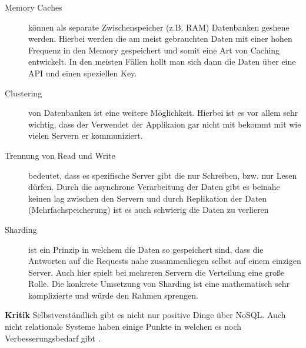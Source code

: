 \begin{description}
	\item[Memory Caches] können als separate Zwischenspeicher (z.B. RAM) Datenbanken geshene werden. Hierbei werden die am meist gebrauchten Daten mit einer hohen Frequenz in den Memory gespeichert und somit eine Art von Caching entwickelt. In den meisten Fällen hollt man sich dann die Daten über eine API und einen speziellen Key.

	\item[Clustering] von Datenbanken ist eine weitere Möglichkeit. Hierbei ist es vor allem sehr wichtig, dass der Verwendet der Applikaion gar nicht mit bekommt mit wie vielen Servern er kommuniziert.

	\item[Trennung von Read und Write] bedeutet, dass es spezifische Server gibt die nur Schreiben, bzw. nur Lesen dürfen. Durch die asynchrone Verarbeitung der Daten gibt es beinahe keinen lag zwischen den Servern und durch Replikation der Daten (Mehrfachspeicherung) ist es auch schwierig die Daten zu verlieren

	\item[Sharding] ist ein Prinzip in welchem die Daten so gespeichert sind, dass die Antworten auf die Requests nahe zusammenliegen selbst auf einem einzigen Server. Auch hier spielt bei mehreren Servern die Verteilung eine große Rolle. Die konkrete Umsetzung von Sharding ist eine mathematisch sehr komplizierte und würde den Rahmen sprengen.
\end{description}

\textbf{Kritik\newline}
Selbstverständlich gibt es nicht nur positive Dinge über NoSQL. Auch nicht relationale Systeme haben einige Punkte in welchen es noch Verbesserungsbedarf gibt \cite{MELD.CH2-noSQL.sqlvsnosql}. 

